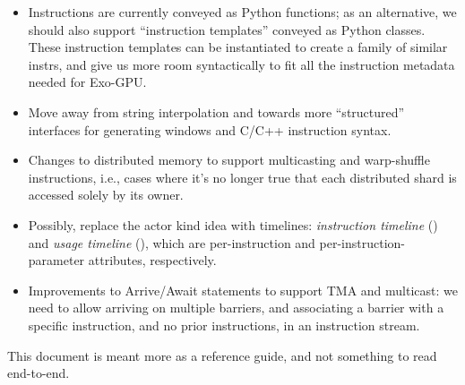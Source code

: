 \begin{itemize}
\item Instructions are currently conveyed as Python functions; as an alternative, we should also support ``instruction templates'' conveyed as Python classes.
These instruction templates can be instantiated to create a family of similar instrs, and give us more room syntactically to fit all the instruction metadata needed for Exo-GPU.
\item Move away from string interpolation and towards more ``structured'' interfaces for generating windows and C/C++ instruction syntax.
\item Changes to distributed memory to support multicasting and warp-shuffle instructions, i.e., cases where it's no longer true that each distributed shard is accessed solely by its owner.
\item Possibly, replace the actor kind idea with timelines: \textit{instruction timeline} () and \textit{usage timeline} (), which are per-instruction and per-instruction-parameter attributes, respectively.
\item Improvements to Arrive/Await statements to support TMA and multicast: we need to allow arriving on multiple barriers, and associating a barrier with a specific instruction, and no prior instructions, in an instruction stream.
\end{itemize}

\filbreak
{}

This document is meant more as a reference guide, and not something to read end-to-end.

{\sffamily
{}








}

\newpage
{}
\label{ch:InstrClass}

